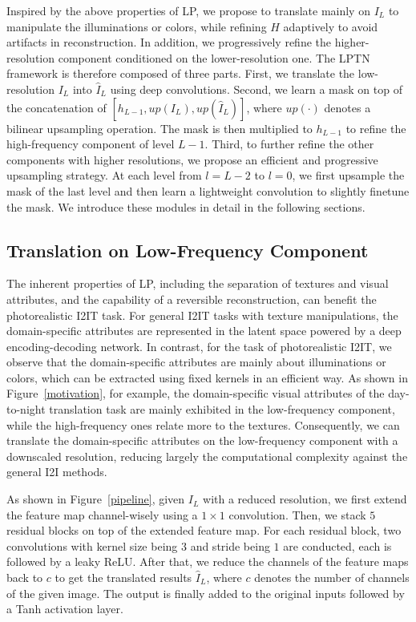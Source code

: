 \documentclass[10pt,twocolumn,letterpaper]{article}
\begin{document}
	Inspired by the above properties of LP, we propose to translate mainly on $I_L$ to manipulate the illuminations or colors, while refining $H$ adaptively to avoid artifacts in reconstruction. In addition, we progressively refine the higher-resolution component conditioned on the lower-resolution one. The LPTN framework is therefore composed of three parts. First, we translate the low-resolution $I_L$ into $\hat{I}_L$ using deep convolutions. Second, we learn a mask on top of the concatenation of $[h_{L-1}, up(I_L), up(\hat{I}_L)]$, where $up(\cdot)$ denotes a bilinear upsampling operation. The mask is then multiplied to $ h_{L-1} $ to refine the high-frequency component of level $ L-1 $. Third, to further refine the other components with higher resolutions, we propose an efficient and progressive upsampling strategy. At each level from $ l=L-2 $ to $l=0$, we first upsample the mask of the last level and then learn a lightweight convolution to slightly finetune the mask. We introduce these modules in detail in the following sections.
	
	\subsection{Translation on Low-Frequency Component}
	\label{low_frequency}
	
	The inherent properties of LP, including the separation of textures and visual attributes, and the capability of a reversible reconstruction, can benefit the photorealistic I2IT task. For general I2IT tasks with texture manipulations, the domain-specific attributes are represented in the latent space powered by a deep encoding-decoding network. In contrast, for the task of photorealistic I2IT, we observe that the domain-specific attributes are mainly about illuminations or colors, which can be extracted using fixed kernels in an efficient way. As shown in Figure~\ref{motivation}, for example, the domain-specific visual attributes of the day-to-night translation task are mainly exhibited in the low-frequency component, while the high-frequency ones relate more to the textures. Consequently, we can translate the domain-specific attributes on the low-frequency component with a downscaled resolution, reducing largely the computational complexity against the general I2I methods.
	
	As shown in Figure~\ref{pipeline}, given $I_L$ with a reduced resolution, we first extend the feature map channel-wisely using a $1\times 1$ convolution. Then, we stack $5$ residual blocks on top of the extended feature map. For each residual block, two convolutions with kernel size being $ 3 $ and stride being $ 1 $ are conducted, each is followed by a leaky ReLU. After that, we reduce the channels of the feature maps back to $c$ to get the translated results $\hat{I}_L$, where $c$ denotes the number of channels of the given image. The output is finally added to the original inputs followed by a Tanh activation layer.
	
\end{document}
